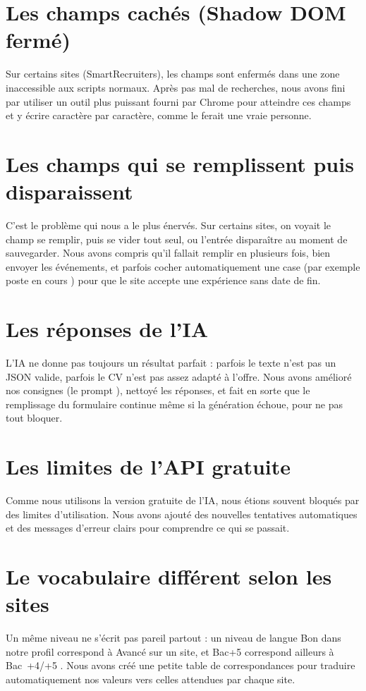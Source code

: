 \documentclass[12pt,a4paper]{report}
\begin{document}
\section{Les champs cach\'es (Shadow DOM ferm\'e)}
Sur certains sites (SmartRecruiters), les champs sont enferm\'es dans une zone
inaccessible aux scripts normaux. Apr\`es pas mal de recherches, nous avons fini
par utiliser un outil plus puissant fourni par Chrome pour \og atteindre \fg{} ces
champs et y \'ecrire caract\`ere par caract\`ere, comme le ferait une vraie personne.

\section{Les champs qui se remplissent puis disparaissent}
C'est le probl\`eme qui nous a le plus \'enerv\'es. Sur certains sites, on voyait le
champ se remplir, puis se vider tout seul, ou l'entr\'ee dispara\^itre au moment de
sauvegarder. Nous avons compris qu'il fallait remplir en plusieurs fois, bien
envoyer les \'ev\'enements, et parfois cocher automatiquement une case (par exemple
\og poste en cours \fg{}) pour que le site accepte une exp\'erience sans date de fin.

\section{Les r\'eponses de l'IA}
L'IA ne donne pas toujours un r\'esultat parfait : parfois le texte n'est pas un
JSON valide, parfois le CV n'est pas assez adapt\'e \`a l'offre. Nous avons am\'elior\'e
nos consignes (le \og prompt \fg{}), nettoy\'e les r\'eponses, et fait en sorte que le
remplissage du formulaire continue m\^eme si la g\'en\'eration \'echoue, pour ne pas
tout bloquer.

\section{Les limites de l'API gratuite}
Comme nous utilisons la version gratuite de l'IA, nous \'etions souvent bloqu\'es
par des limites d'utilisation. Nous avons ajout\'e des nouvelles tentatives
automatiques et des messages d'erreur clairs pour comprendre ce qui se passait.

\section{Le vocabulaire diff\'erent selon les sites}
Un m\^eme niveau ne s'\'ecrit pas pareil partout : un niveau de langue \og Bon \fg{}
dans notre profil correspond \`a \og Avanc\'e \fg{} sur un site, et \og Bac+5 \fg{}
correspond ailleurs \`a \og Bac~+4/+5 \fg{}. Nous avons cr\'e\'e une petite table de
correspondances pour traduire automatiquement nos valeurs vers celles attendues
par chaque site.
\end{document}
